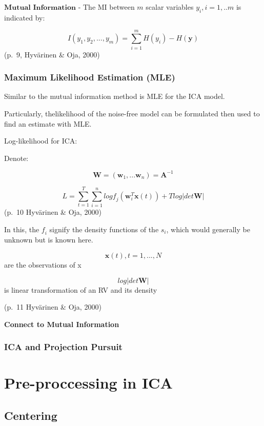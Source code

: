 \documentclass[12pt,twoside]{amherstthesis}
\begin{document}
  \(\textbf{Mutual Information}\) - The MI between \(\textit{m}\) scalar
  variables \(y_i,\textit{i} = 1,..m\) is indicated by:
  
  \[ I(y_1,y_2,...,y_\textit{m}) = \sum_{i=1}^m H(y_\textit{i})-H(\textbf{y})\]
  (p.~9, Hyvärinen \& Oja, 2000)
  
  \subsubsection{Maximum Likelihood Estimation
  (MLE)}\label{maximum-likelihood-estimation-mle}
  
  Similar to the mutual information method is MLE for the ICA model.
  
  Particularly, thelikelihood of the noise-free model can be formulated
  then used to find an estimate with MLE.
  
  Log-likelihood for ICA:
  
  Denote:
  
  \[ \textbf{W} = (\textbf{w}_1,...\textbf{w}_n) = \textbf{A}^{-1} \]
  
  \[ L = \sum_{t=1}^T \sum_{i=1}^n log \textit{f}_j(\textbf{w}_\textit{i}^T  \textbf{x}(t))+\textit{T}log|det\textbf{W}|\]
  (p.~10 Hyvärinen \& Oja, 2000)
  
  In this, the \(\textit{f}_i\) signify the density functions of the
  \(s_i\), which would generally be unknown but is known here.
  
  \[ \textbf{x}(t), t= 1,...,N\] are the observations of x
  
  \[ log|det\textbf{W}|\] is linear transformation of an RV and its
  density
  
  (p.~11 Hyvärinen \& Oja, 2000)
  
  \textbf{Connect to Mutual Information}
  
  \subsubsection{ICA and Projection
  Pursuit}\label{ica-and-projection-pursuit}
  
  \section{Pre-proccessing in ICA}\label{pre-proccessing-in-ica}
  
  \subsection{Centering}\label{centering}
  
\end{document}
